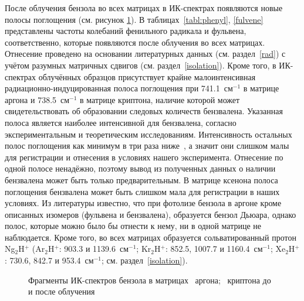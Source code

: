 {После облучения бензола во всех матрицах в ИК-спектрах появляются новые полосы поглощения (см. рисунок \ref{spectra}).
В таблицах~\ref{tabl:phenyl}, \ref{fulvene} представлены частоты колебаний фенильного радикала и фульвена, соответственно, 
которые появляются после облучения во всех матрицах. Отнесение проведено на основании литературных данных (см. раздел~\ref{rad}) с учётом разумных матричных сдвигов (см. раздел~\ref{isolation}). Кроме того, в ИК-спектрах облучённых образцов присутствует крайне малоинтенсивная радиационно-индуцированная полоса поглощения при 741.1~см$^{-1}$ в матрице аргона и 738.5~см$^{-1}$ в матрице криптона, наличие которой может свидетельствовать об образовании следовых количеств бензвалена. Указанная полоса является наиболее интенсивной для бензвалена, согласно экспериментальным и теоретическим исследованиям. Интенсивность остальных полос поглощения как минимум в три раза ниже~\cite{Toh2015}, а значит они  слишком малы для регистрации и отнесения в условиях нашего эксперимента. Отнесение по одной полосе ненадёжно, поэтому вывод из полученных данных о наличии бензвалена может быть только предварительным. В матрице ксенона полоса поглощения бензвалена может быть слишком мала для регистрации в наших условиях. Из литературы известно, что при фотолизе бензола в аргоне кроме описанных изомеров (фульвена и бензвалена), образуется бензол Дьюара, однако полос, которые можно было бы отнести к нему, ни в одной матрице не наблюдается. Кроме того, во всех матрицах образуется сольватированный протон Ng$_2$H$^+$ 
(Ar$_2$H$^+$: 903.3 и 1139.6~см$^{-1}$; Kr$_2$H$^+$: 852.5, 1007.7 и 1160.4~см$^{-1}$; Xe$_2$H$^+$: 730.6, 842.7 и 953.4~см$^{-1}$; см. раздел~\ref{isolation}). 

\begin{figure}[H]  
\centering 
\hspace{-6ex}
\caption{Фрагменты ИК-спектров бензола в матрицах ~аргона; ~криптона до и после облучения} 
\label{spectra}
\end{figure}

}
